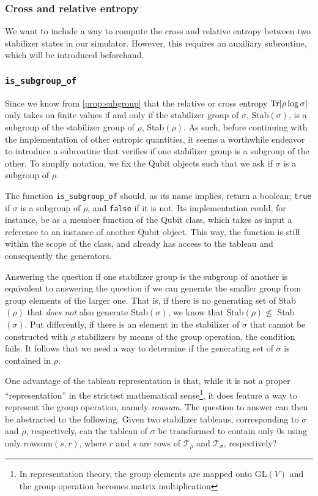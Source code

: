 \subsubsection{Cross and relative entropy}
We want to include a way to compute the cross and relative entropy between two
stabilizer states in our simulator. However, this requires an auxiliary
subroutine, which will be introduced beforehand.

\subsubsection{\texttt{is\_subgroup\_of}}
Since we know from \cref{prop:subgroup} that the relative or cross
entropy $\Tr[\rho\log\sigma]$ only takes on finite values if and only if the
stabilizer group of $\sigma$, Stab$(\sigma)$, is a subgroup of the stabilizer group
of $\rho$, Stab$(\rho)$. As such, before continuing with the implementation of
other entropic quantities, it seems a worthwhile endeavor to introduce a
subroutine that verifies if one stabilizer group is a subgroup of the other.
To simplfy notation, we fix the Qubit objects such that we ask if $\sigma$ is a
subgroup of $\rho$.

The function \verb|is_subgroup_of| should, as its name implies, return a
boolean; \verb|true| if $\sigma$ is a subgroup of $\rho$, and \verb|false| if
it is not. Its implementation could, for instance, be as a member function of
the Qubit class, which takes as input a reference to an instance of another Qubit
object. This way, the function is still within the scope of the class,
and already has access to the tableau and consequently the generators. 

Answering the question if one stabilizer group is the subgroup of another is
equivalent to answering the question if we can generate the smaller group from
group elements of the larger one. That is, if there is no generating set of
Stab$(\rho)$ that \emph{does not} also generate Stab$(\sigma)$, we know that
Stab$(\rho)\not\leq$ Stab$(\sigma)$. Put differently, if there is an element in
the stabilizer of $\sigma$ that cannot be constructed with $\rho$ stabilizers
by means of the group operation, the condition fails.
It follows that we need a way to determine if the generating set of $\sigma$ is
contained in $\rho$.

One advantage of the tableau representation is that, while it is not a proper
\enquote{representation} in the strictest mathematical sense\footnote{In
representation theory, the group elements are mapped onto GL$(V)$ and the group
operation becomes matrix multiplication}, it does feature a way to represent
the group operation, namely \emph{rowsum}. The question to answer can then be
abstracted to the following. Given two stabilizer tableaus, corresponding to
$\sigma$ and $\rho$, respectively, can the tableau of $\sigma$ be transformed
to contain only $0$s using only rowsum$(s,r)$, where $r$ and $s$ are rows of
$\mathcal{T}_\rho$ and $\mathcal{T}_\sigma$, respectively?

